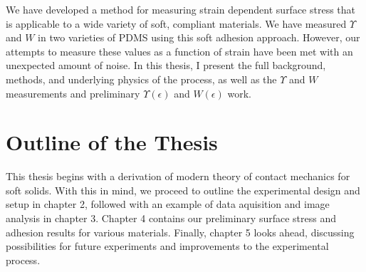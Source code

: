 We have developed a method for measuring strain dependent surface stress that is applicable to a wide variety of soft, compliant materials. We have measured $ \Upsilon $ and $ W $ in two varieties of PDMS using this soft adhesion approach. However, our attempts to measure these values as a function of strain have been met with an unexpected amount of noise.   In this thesis, I present the full background, methods, and underlying physics of the process, as well as the $ \Upsilon $ and $ W $ measurements and preliminary $ \Upsilon(\epsilon) $ and $ W(\epsilon) $ work.  



 




\section{Outline of the Thesis}
This thesis begins with a derivation of modern theory of contact mechanics for soft solids. With this in mind, we proceed to outline the experimental design and setup in chapter 2, followed with an example of data aquisition and image analysis in chapter 3. Chapter 4 contains our preliminary surface stress and adhesion results for various materials. Finally, chapter 5 looks ahead, discussing possibilities for future experiments and improvements to the experimental process.